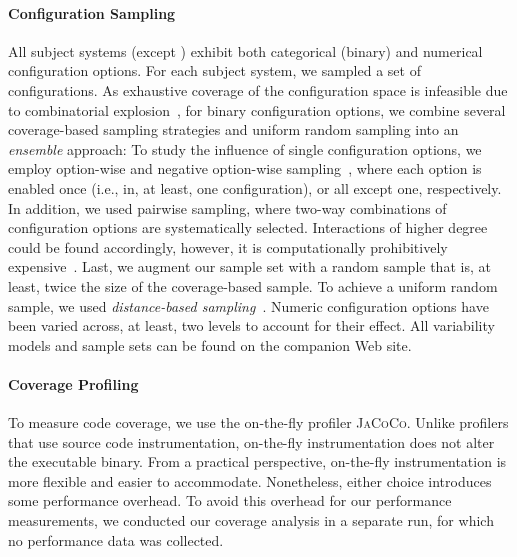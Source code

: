 \paragraph{Configuration Sampling}\label{sec:sampling}
All subject systems (except \htwo) exhibit both categorical (binary) and numerical configuration options. 
For each subject system, we sampled a set of configurations. As exhaustive coverage of the configuration space is infeasible due to combinatorial explosion~\cite{henardCombining2015}, for binary configuration options, we combine several coverage-based sampling strategies and uniform random sampling into an \emph{ensemble} approach: 
To study the influence of single configuration options, we employ option-wise and negative option-wise sampling~\cite{siegmundPerformanceinfluenceModelsHighly2015}, where each option is enabled once (i.e., in, at least, one configuration), or all except one, respectively. In addition, we used pairwise sampling, where two-way combinations of configuration options are systematically selected. Interactions of higher degree could be found accordingly, however, it is computationally prohibitively expensive~\cite{henardCombining2015}. 
Last, we augment our sample set with a random sample that is, at least, twice the size of the coverage-based sample. To achieve a uniform random sample, we used \emph{distance-based sampling}~\cite{kaltenecker_distance-based_2019}. Numeric configuration options have been varied across, at least, two levels to account for their effect. All variability models and sample sets can be found on the companion Web site.
	
\paragraph{Coverage Profiling}\label{sec:profiling}
To measure code coverage, we use the on-the-fly profiler \textsc{JaCoCo}. Unlike profilers that use source code instrumentation, on-the-fly instrumentation does not alter the executable binary. From a practical perspective, on-the-fly instrumentation is more flexible and easier to accommodate. Nonetheless, either choice introduces some performance overhead. To avoid this overhead for our performance measurements, we conducted our coverage analysis in a separate run, for which no performance data was collected. 	
	

